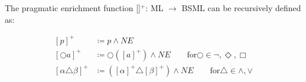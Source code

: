 The pragmatic enrichment function [\quad]\(^+\): ML \(\rightarrow\) BSML can be recursively defined as:


\begin{align*}
{[p]}^+ &\coloneqq p \land NE \\
{[\bigcirc a]}^+ &\coloneqq \bigcirc({[a]}^+)\land NE  \quad \quad \text{for} \bigcirc \in {\neg,\Diamond,\Box}\\
{[\alpha \triangle \beta ]}^+ &\coloneqq ({[\alpha]}^+ \triangle {[\beta]}^+)\land NE \quad \quad \text{for} \triangle \in {\land, \lor}
\end{align*}